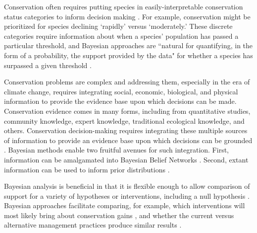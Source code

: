 \documentclass{article}
\begin{document}
\par Conservation often requires putting species in easily-interpretable conservation status categories to inform decision making \citep{brooks2008quantifying}. For example, conservation might be prioritized for species declining `rapidly' versus `moderately.' These discrete categories require information about when a species' population has passed a particular threshold, and Bayesian approaches are ``natural for quantifying, in the form of a probability, the support provided by the data" for whether a species has surpassed a given threshold  \citep{brooks2008quantifying}. 

\par Conservation problems are complex and addressing them, especially in the era of climate change, requires integrating social, economic, biological, and physical information to provide the evidence base upon which decisions can be made. Conservation evidence comes in many forms, including from quantitative studies, community knowledge, expert knowledge, traditional ecological knowledge, and others. Conservation decision-making requires integrating these multiple sources of information to provide an evidence base upon which decisions can be grounded \citep{stern2022interweaving}. Bayesian methods enable two fruitful avenues for such integration. First, information can be amalgamated into Bayesian Belief Networks \citep{marcot2001using,newton2007bayesian}. Second, extant information can be used to inform prior distributions \citep{o2008informed}. %

Bayesian analysis is beneficial in that it is flexible enough to allow comparison of support for a variety of hypotheses or interventions, including a null hypothesis \citep{Zyl2018}. Bayesian approaches facilitate comparing, for example, which interventions will most likely bring about conservation gains \citep{prato2005bayesian}, and whether the current versus alternative management practices produce similar results \citep{gallistel2009importance}.
\end{document}
